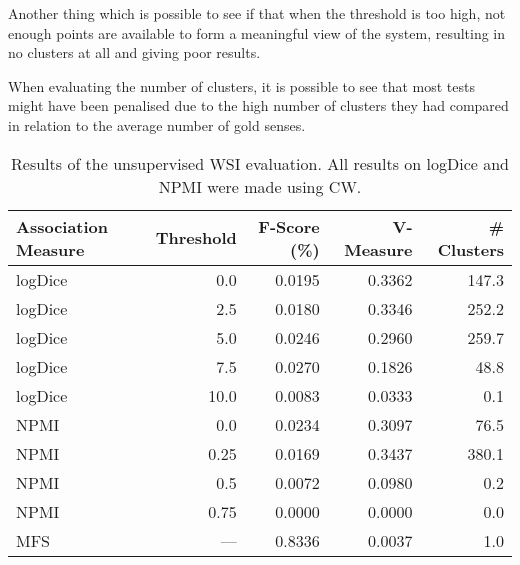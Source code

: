 Another thing which is possible to see if that when the threshold is too high,
not enough points are available to form a meaningful view of the system,
resulting in no clusters at all and giving poor results.

When evaluating the number of clusters, it is possible to see that most tests
might have been penalised due to the high number of clusters they had compared
in relation to the average number of gold senses.

\begin{table}[ht]
\caption{Results of the unsupervised \ac{WSI} evaluation. All results on logDice
and \ac{NPMI} were made using \ac{CW}.}
\label{tab:unsup-results}
\begin{tabu} to \textwidth {Xrrrr}
\hline
\textbf{Association Measure} & \textbf{Threshold} & \textbf{F-Score (\%)} & \textbf{V-Measure} & \textbf{\# Clusters} \\
\hline
logDice   &  0.0 & 0.0195 & 0.3362 & 147.3 \\
logDice   &  2.5 & 0.0180 & 0.3346 & 252.2 \\
logDice   &  5.0 & 0.0246 & 0.2960 & 259.7 \\
logDice   &  7.5 & 0.0270 & 0.1826 &  48.8 \\
logDice   & 10.0 & 0.0083 & 0.0333 &   0.1 \\
\hline
\ac{NPMI} & 0.0  & 0.0234 & 0.3097 &  76.5 \\
\ac{NPMI} & 0.25 & 0.0169 & 0.3437 & 380.1 \\
\ac{NPMI} & 0.5  & 0.0072 & 0.0980 &   0.2 \\
\ac{NPMI} & 0.75 & 0.0000 & 0.0000 &   0.0 \\
\hline
\ac{MFS}  &  --- & 0.8336 & 0.0037 &   1.0 \\
\hline
\end{tabu}
\end{table}


